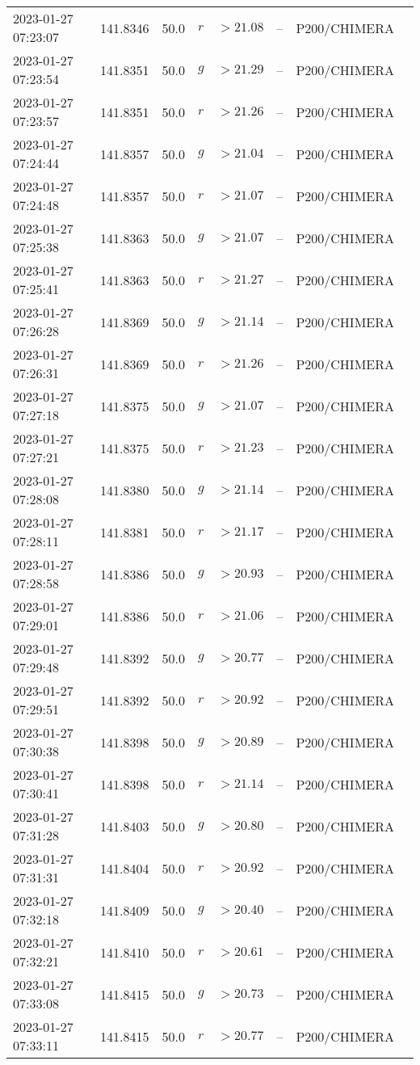 \documentclass{nature_plusfigure}
\begin{document}
\begin{supplement}
\begin{center}
\begin{longtable}{llllllll}
2023-01-27 07:23:07 & 141.8346 & 50.0 & $r$ & $>21.08$ & -- & P200/CHIMERA &  \\ 
2023-01-27 07:23:54 & 141.8351 & 50.0 & $g$ & $>21.29$ & -- & P200/CHIMERA &  \\ 
2023-01-27 07:23:57 & 141.8351 & 50.0 & $r$ & $>21.26$ & -- & P200/CHIMERA &  \\ 
2023-01-27 07:24:44 & 141.8357 & 50.0 & $g$ & $>21.04$ & -- & P200/CHIMERA &  \\ 
2023-01-27 07:24:48 & 141.8357 & 50.0 & $r$ & $>21.07$ & -- & P200/CHIMERA &  \\ 
2023-01-27 07:25:38 & 141.8363 & 50.0 & $g$ & $>21.07$ & -- & P200/CHIMERA &  \\ 
2023-01-27 07:25:41 & 141.8363 & 50.0 & $r$ & $>21.27$ & -- & P200/CHIMERA &  \\ 
2023-01-27 07:26:28 & 141.8369 & 50.0 & $g$ & $>21.14$ & -- & P200/CHIMERA &  \\ 
2023-01-27 07:26:31 & 141.8369 & 50.0 & $r$ & $>21.26$ & -- & P200/CHIMERA &  \\ 
2023-01-27 07:27:18 & 141.8375 & 50.0 & $g$ & $>21.07$ & -- & P200/CHIMERA &  \\ 
2023-01-27 07:27:21 & 141.8375 & 50.0 & $r$ & $>21.23$ & -- & P200/CHIMERA &  \\ 
2023-01-27 07:28:08 & 141.8380 & 50.0 & $g$ & $>21.14$ & -- & P200/CHIMERA &  \\ 
2023-01-27 07:28:11 & 141.8381 & 50.0 & $r$ & $>21.17$ & -- & P200/CHIMERA &  \\ 
2023-01-27 07:28:58 & 141.8386 & 50.0 & $g$ & $>20.93$ & -- & P200/CHIMERA &  \\ 
2023-01-27 07:29:01 & 141.8386 & 50.0 & $r$ & $>21.06$ & -- & P200/CHIMERA &  \\ 
2023-01-27 07:29:48 & 141.8392 & 50.0 & $g$ & $>20.77$ & -- & P200/CHIMERA &  \\ 
2023-01-27 07:29:51 & 141.8392 & 50.0 & $r$ & $>20.92$ & -- & P200/CHIMERA &  \\ 
2023-01-27 07:30:38 & 141.8398 & 50.0 & $g$ & $>20.89$ & -- & P200/CHIMERA &  \\ 
2023-01-27 07:30:41 & 141.8398 & 50.0 & $r$ & $>21.14$ & -- & P200/CHIMERA &  \\ 
2023-01-27 07:31:28 & 141.8403 & 50.0 & $g$ & $>20.80$ & -- & P200/CHIMERA &  \\ 
2023-01-27 07:31:31 & 141.8404 & 50.0 & $r$ & $>20.92$ & -- & P200/CHIMERA &  \\ 
2023-01-27 07:32:18 & 141.8409 & 50.0 & $g$ & $>20.40$ & -- & P200/CHIMERA &  \\ 
2023-01-27 07:32:21 & 141.8410 & 50.0 & $r$ & $>20.61$ & -- & P200/CHIMERA &  \\ 
2023-01-27 07:33:08 & 141.8415 & 50.0 & $g$ & $>20.73$ & -- & P200/CHIMERA &  \\ 
2023-01-27 07:33:11 & 141.8415 & 50.0 & $r$ & $>20.77$ & -- & P200/CHIMERA &  \\ 
\hline 
\end{longtable} 
\end{center} 



\end{supplement}
\end{document}
